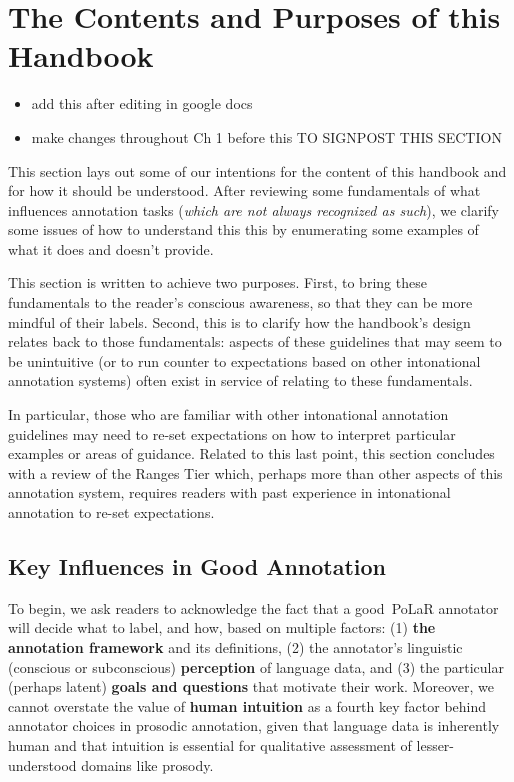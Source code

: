 \documentclass[11pt, twoside]{memoir}
\begin{document}
\section{The Contents and Purposes of this Handbook}
%

\begingroup\color{red}
\begin{itemize}
	\tightlist
	\item add this after editing in google docs
	\item make changes throughout Ch 1 before this TO SIGNPOST THIS SECTION 
\end{itemize}
\endgroup

This section lays out some of our intentions for the content of this handbook and for how it should be understood. After reviewing some fundamentals of what influences annotation tasks (\textit{which are not always recognized as such}), we clarify some issues of how to understand this this by enumerating some examples of what it does and doesn't provide. 

This section is written to achieve two purposes. First, to bring these fundamentals to the reader's conscious awareness, so that they can be more mindful of their labels. Second, this is to clarify how the handbook's design relates back to those fundamentals: aspects of these guidelines that may seem to be unintuitive (or to run counter to expectations based on other intonational annotation systems) often exist in service of relating to these fundamentals.

In particular, those who are familiar with other intonational annotation guidelines may need to re-set expectations on how to interpret particular examples or areas of guidance. Related to this last point, this section concludes with a review of the Ranges Tier which, perhaps more than other aspects of this annotation system, requires readers with past experience in intonational annotation to re-set expectations.

\subsection{Key Influences in Good Annotation}\label{sec:Key Influences in Good Annotation}

To begin, we ask readers to acknowledge the fact that a good PoLaR annotator will decide what to label, and how, based on multiple factors: (1) \textbf{the annotation framework} and its definitions, (2) the annotator's linguistic (conscious or subconscious) \textbf{perception} of language data, and (3) the particular (perhaps latent) \textbf{goals and questions} that motivate their work. Moreover, we cannot overstate the value of \textbf{human intuition} as a fourth key factor behind annotator choices in prosodic annotation, given that language data is inherently human and that intuition is essential for qualitative assessment of lesser-understood domains like prosody. 
\end{document}
